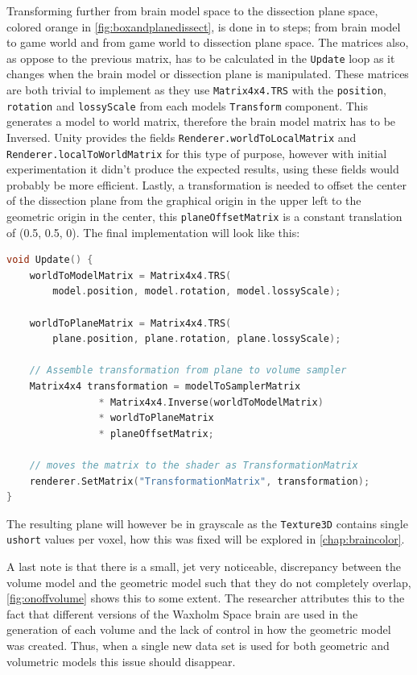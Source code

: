Transforming further from brain model space to the dissection plane space, colored orange in \autoref{fig:boxandplanedissect}, is done in to steps; from brain model to game world and from game world to dissection plane space. The matrices also, as oppose to the previous matrix, has to be calculated in the \texttt{Update} loop as it changes when the brain model or dissection plane is manipulated. These matrices are both trivial to implement as they use \texttt{Matrix4x4.TRS} with the \texttt{position}, \texttt{rotation} and \texttt{lossyScale} from each models \texttt{Transform} component.  This generates a model to world matrix, therefore the brain model matrix has to be Inversed. Unity provides the fields \texttt{Renderer.worldToLocalMatrix} and \\\texttt{Renderer.localToWorldMatrix} for this type of purpose, however with initial experimentation it didn't produce the expected results, using these fields would probably be more efficient. Lastly, a transformation is needed to offset the center of the dissection plane from the graphical origin in the upper left to the geometric origin in the center, this \texttt{planeOffsetMatrix} is a constant translation of (0.5, 0.5, 0). The final implementation will look like this:
\newpage
\begin{lstlisting}[language=c++]
void Update() {
    worldToModelMatrix = Matrix4x4.TRS(
        model.position, model.rotation, model.lossyScale);

    worldToPlaneMatrix = Matrix4x4.TRS(
        plane.position, plane.rotation, plane.lossyScale);

    // Assemble transformation from plane to volume sampler
    Matrix4x4 transformation = modelToSamplerMatrix 
                * Matrix4x4.Inverse(worldToModelMatrix)
                * worldToPlaneMatrix
                * planeOffsetMatrix;

    // moves the matrix to the shader as TransformationMatrix
    renderer.SetMatrix("TransformationMatrix", transformation);
}
\end{lstlisting}

The resulting plane will however be in grayscale as the \texttt{Texture3D} contains single \texttt{ushort} values per voxel, how this was fixed will be explored in \autoref{chap:braincolor}.

A last note is that there is a small, jet very noticeable, discrepancy between the volume model and the geometric model such that they do not completely overlap, \autoref{fig:onoffvolume} shows this to some extent. The researcher attributes this to the fact that different versions of the Waxholm Space brain are used in the generation of each volume and the lack of control in how the geometric model was created. Thus, when a single new data set is used for both geometric and volumetric models this issue should disappear.


